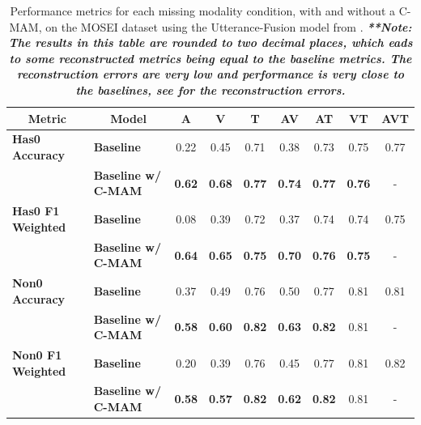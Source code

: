 \begin{table}[h!]
\centering
\caption{Performance metrics for each missing modality condition, with and without a C-MAM, on the MOSEI dataset using the Utterance-Fusion model from \cite{zhao-etal-2021-missing}. \textbf{\textit{**Note: The results in this table are rounded to two decimal places, which eads to some reconstructed metrics being equal to the baseline metrics. The reconstruction errors are very low and performance is very close to the baselines, see  for the reconstruction errors.}}}
\label{tab:mosei_results}
\begin{tabular}{ll|ccccccc}
\hline
\multicolumn{1}{c}{\textbf{Metric}} & \multicolumn{1}{c|}{\textbf{Model}} & \textbf{A} & \textbf{V} & \textbf{T} & \textbf{AV} & \textbf{AT} & \textbf{VT} & \textbf{AVT} \\ \hline
\textbf{Has0 Accuracy}    & \textbf{Baseline}          & 0.22          & 0.45          & 0.71          & 0.38          & 0.73          & 0.75          & 0.77 \\
\textbf{}                 & \textbf{Baseline w/ C-MAM} & \textbf{0.62} & \textbf{0.68} & \textbf{0.77} & \textbf{0.74} & \textbf{0.77} & \textbf{0.76} & -    \\ \hline
\textbf{Has0 F1 Weighted} & \textbf{Baseline}          & 0.08          & 0.39          & 0.72          & 0.37          & 0.74          & 0.74          & 0.75 \\
\textbf{}                 & \textbf{Baseline w/ C-MAM} & \textbf{0.64} & \textbf{0.65} & \textbf{0.75} & \textbf{0.70} & \textbf{0.76} & \textbf{0.75} & -    \\ \hline
\textbf{Non0 Accuracy}    & \textbf{Baseline}          & 0.37          & 0.49          & 0.76          & 0.50          & 0.77          & 0.81          & 0.81 \\
\textbf{}                 & \textbf{Baseline w/ C-MAM} & \textbf{0.58} & \textbf{0.60} & \textbf{0.82} & \textbf{0.63} & \textbf{0.82} & 0.81          & -    \\ \hline
\textbf{Non0 F1 Weighted} & \textbf{Baseline}          & 0.20          & 0.39          & 0.76          & 0.45          & 0.77          & 0.81          & 0.82 \\
\textbf{}                 & \textbf{Baseline w/ C-MAM} & \textbf{0.58} & \textbf{0.57} & \textbf{0.82} & \textbf{0.62} & \textbf{0.82} & 0.81          & -    \\ \hline
\end{tabular}
\end{table}


